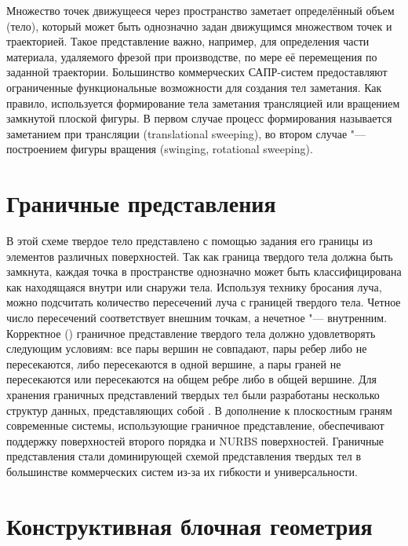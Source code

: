 Множество точек движущееся через пространство заметает определённый объем (тело), который может быть однозначно задан движущимся множеством точек и траекторией. Такое представление важно, например, для определения части материала, удаляемого фрезой при производстве, по мере её перемещения по заданной траектории. Большинство коммерческих САПР-систем предоставляют ограниченные функциональные возможности для создания тел заметания. Как правило, используется формирование тела заметания трансляцией или вращением замкнутой плоской фигуры. В первом случае процесс формирования называется заметанием при трансляции (translational sweeping), во втором случае "--- построением фигуры вращения (swinging, rotational sweeping).

\section{Граничные представления} \label{sect_boundary_rep}

В этой схеме твердое тело представлено с помощью задания его границы из элементов различных поверхностей. Так как граница твердого тела должна быть замкнута, каждая точка в пространстве однозначно может быть классифицирована как находящаяся внутри или снаружи тела. Используя технику бросания луча, можно подсчитать количество пересечений  луча с границей твердого тела. Четное число пересечений соответствует внешним точкам, а нечетное "--- внутренним. Корректное () граничное представление твердого тела должно удовлетворять следующим условиям: все пары вершин не совпадают, пары ребер либо не пересекаются, либо пересекаются в одной вершине, а пары граней не пересекаются или пересекаются на общем ребре либо в общей вершине. Для хранения граничных представлений твердых тел были разработаны несколько структур данных, представляющих собой . В дополнение к плоскостным граням современные системы, использующие граничное представление, обеспечивают поддержку поверхностей второго порядка и NURBS поверхностей. Граничные представления стали доминирующей схемой представления твердых тел в большинстве коммерческих систем из-за их гибкости и универсальности.


\section{Конструктивная блочная геометрия} \label{sect_csg}

